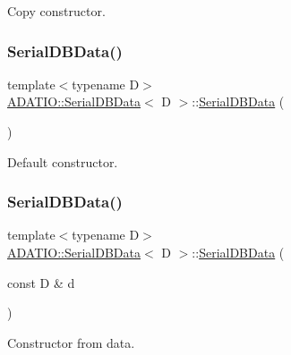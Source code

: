 Copy constructor. 

\mbox{\label{classADATIO_1_1SerialDBData_a07279a443371f31d9e0ef857fab17fa5}} 
\subsubsection{\texorpdfstring{SerialDBData()}{SerialDBData()}\hspace{0.1cm}{\footnotesize\ttfamily [7/9]}}
{\footnotesize\ttfamily template$<$typename D$>$ \\
\mbox{\hyperlink{classADATIO_1_1SerialDBData}{A\+D\+A\+T\+I\+O\+::\+Serial\+D\+B\+Data}}$<$ D $>$\+::\mbox{\hyperlink{classADATIO_1_1SerialDBData}{Serial\+D\+B\+Data}} (\begin{DoxyParamCaption}{ }\end{DoxyParamCaption})\hspace{0.3cm}{\ttfamily [inline]}}



Default constructor. 

\mbox{\label{classADATIO_1_1SerialDBData_afe5b91aca4221cfce681c85498a46f0c}} 
\subsubsection{\texorpdfstring{SerialDBData()}{SerialDBData()}\hspace{0.1cm}{\footnotesize\ttfamily [8/9]}}
{\footnotesize\ttfamily template$<$typename D$>$ \\
\mbox{\hyperlink{classADATIO_1_1SerialDBData}{A\+D\+A\+T\+I\+O\+::\+Serial\+D\+B\+Data}}$<$ D $>$\+::\mbox{\hyperlink{classADATIO_1_1SerialDBData}{Serial\+D\+B\+Data}} (\begin{DoxyParamCaption}\item[{const D \&}]{d }\end{DoxyParamCaption})\hspace{0.3cm}{\ttfamily [inline]}}



Constructor from data. 

